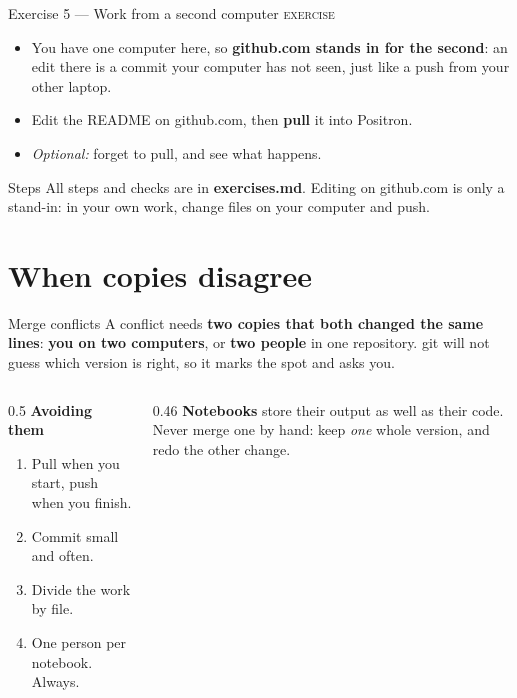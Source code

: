 \documentclass[aspectratio=169,11pt]{beamer}
\newcommand{\key}[1]{\textbf{\textcolor{ban}{#1}}}
\newcommand{\exerciseframe}[3]{%
  \begin{frame}[t]{#1}
    \vspace{0.4em}
    {\small\textcolor{softgray}{\textsc{exercise}}}\par\vspace{0.6em}
    #2
    \vfill
    \begin{block}{Steps}
      All steps and checks are in \key{exercises.md}. #3
    \end{block}
    \vspace{0.6em}
  \end{frame}}
\begin{document}
\exerciseframe{Exercise 5 --- Work from a second computer}{%
  \begin{itemize}
    \item You have one computer here, so \textbf{github.com stands in for the second}: an edit there is a commit your computer has not seen, just like a push from your other laptop.
    \item Edit the README on github.com, then \key{pull} it into Positron.
    \item \emph{Optional:} forget to pull, and see what happens.
  \end{itemize}}{Editing on github.com is only a stand-in: in your own work, change files on your computer and push.}

\section{When copies disagree}

\begin{frame}{Merge conflicts}
  A conflict needs \textbf{two copies that both changed the same lines}: \textbf{you on two computers}, or \textbf{two people} in one repository. git will not guess which version is right, so it marks the spot and asks you.
  \vspace{0.8em}
  \begin{columns}[T]
    \begin{column}{0.5\textwidth}
      \textbf{Avoiding them}
      \begin{enumerate}
        \item Pull when you start, push when you finish.
        \item Commit small and often.
        \item Divide the work by file.
        \item One person per notebook. Always.
      \end{enumerate}
    \end{column}
    \begin{column}{0.46\textwidth}
      \textbf{Notebooks} store their output as well as their code. Never merge one by hand: keep \emph{one} whole version, and redo the other change.
    \end{column}
  \end{columns}
\end{frame}
\end{document}
